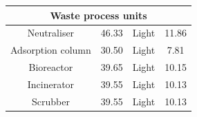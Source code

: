 \begin{table}[H]
\begin{tabular}{cccc}
\multicolumn{4}{c}{Waste process units}                                                        \\\hline
Neutraliser                    &   46.33            &     Light                      &   11.86                                 \\
Adsorption column                    &   30.50             &     Light                      &  7.81     \\         
Bioreactor                    &   39.65            &     Light                      &   10.15                                 \\
Incinerator                 &   39.55             &     Light                      &  10.13     \\    
Scrubber                 &   39.55             &     Light                      &  10.13     \\\bottomrule

\end{tabular}
\end{table}